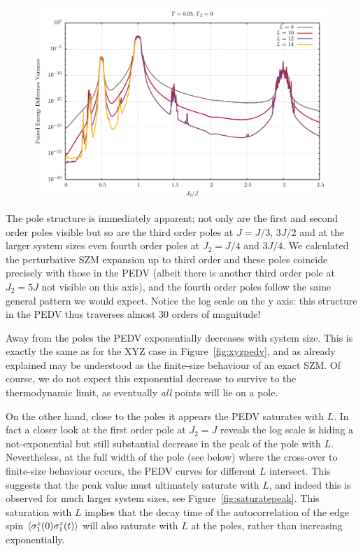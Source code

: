 \documentclass [a4paper, 11pt]{article}
\begin{document}
\begin{figure} [htbp]
\centering
 \includegraphics[width=\linewidth]{poles_lowf.pdf}
\caption{}
\label{fig:pedvj2}
\end{figure}


The pole structure is immediately apparent; not only are the first and second order poles visible but so are the third order poles at $J = J/3$, $3J/2$ and at the larger system sizes even fourth order poles at $J_2 = J/4$ and $3 J/4$. We calculated the perturbative SZM expansion up to third order and these poles coincide precisely with those in the PEDV (albeit there is another third order pole at $J_2 = 5 J$ not visible on this axis), and the fourth order poles follow the same general pattern we would expect. Notice the log scale on the y axis: this structure in the PEDV thus traverses almost 30 orders of magnitude!

Away from the poles the PEDV exponentially decreases with system size. This is exactly the same as for the XYZ case in Figure~\ref{fig:xyzpedv}, and as already explained may be understood as the finite-size behaviour of an exact SZM. Of course, we do not expect this exponential decrease to survive to the thermodynamic limit, as eventually \emph{all} points will lie on a pole.

On the other hand, close to the poles it appears the PEDV saturates with $L$. In fact a closer look at the first order pole at $J_2 = J$ reveals the log scale is hiding a not-exponential but still substantial decrease in the peak of the pole with $L$. Nevertheless, at the full width of the pole (see below) where the cross-over to finite-size behaviour occurs, the PEDV curves for different $L$ intersect. This suggests that the peak value must ultimately saturate with $L$, and indeed this is observed for much larger system sizes, see Figure~\ref{fig:saturatepeak}. This saturation with $L$ implies that the decay time of the autocorrelation of the edge spin $\Braket{\sigma^z_1(0)\sigma^z_1(t)}$ will also saturate with $L$ at the poles, rather than increasing exponentially.
\end{document}

